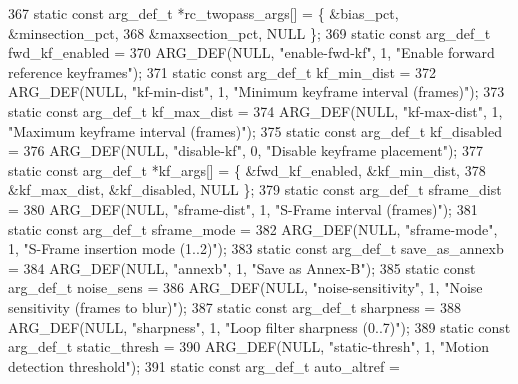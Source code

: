 \begin{DoxyCodeInclude}
{{{{{{{367 \textcolor{keyword}{static} \textcolor{keyword}{const} arg\_def\_t *rc\_twopass\_args[] = \{ &bias\_pct, &minsection\_pct,
368                                               &maxsection\_pct, NULL \};
369 \textcolor{keyword}{static} \textcolor{keyword}{const} arg\_def\_t fwd\_kf\_enabled =
370     ARG\_DEF(NULL, \textcolor{stringliteral}{"enable-fwd-kf"}, 1, \textcolor{stringliteral}{"Enable forward reference keyframes"});
371 \textcolor{keyword}{static} \textcolor{keyword}{const} arg\_def\_t kf\_min\_dist =
372     ARG\_DEF(NULL, \textcolor{stringliteral}{"kf-min-dist"}, 1, \textcolor{stringliteral}{"Minimum keyframe interval (frames)"});
373 \textcolor{keyword}{static} \textcolor{keyword}{const} arg\_def\_t kf\_max\_dist =
374     ARG\_DEF(NULL, \textcolor{stringliteral}{"kf-max-dist"}, 1, \textcolor{stringliteral}{"Maximum keyframe interval (frames)"});
375 \textcolor{keyword}{static} \textcolor{keyword}{const} arg\_def\_t kf\_disabled =
376     ARG\_DEF(NULL, \textcolor{stringliteral}{"disable-kf"}, 0, \textcolor{stringliteral}{"Disable keyframe placement"});
377 \textcolor{keyword}{static} \textcolor{keyword}{const} arg\_def\_t *kf\_args[] = \{ &fwd\_kf\_enabled, &kf\_min\_dist,
378                                       &kf\_max\_dist, &kf\_disabled, NULL \};
379 \textcolor{keyword}{static} \textcolor{keyword}{const} arg\_def\_t sframe\_dist =
380     ARG\_DEF(NULL, \textcolor{stringliteral}{"sframe-dist"}, 1, \textcolor{stringliteral}{"S-Frame interval (frames)"});
381 \textcolor{keyword}{static} \textcolor{keyword}{const} arg\_def\_t sframe\_mode =
382     ARG\_DEF(NULL, \textcolor{stringliteral}{"sframe-mode"}, 1, \textcolor{stringliteral}{"S-Frame insertion mode (1..2)"});
383 \textcolor{keyword}{static} \textcolor{keyword}{const} arg\_def\_t save\_as\_annexb =
384     ARG\_DEF(NULL, \textcolor{stringliteral}{"annexb"}, 1, \textcolor{stringliteral}{"Save as Annex-B"});
385 \textcolor{keyword}{static} \textcolor{keyword}{const} arg\_def\_t noise\_sens =
386     ARG\_DEF(NULL, \textcolor{stringliteral}{"noise-sensitivity"}, 1, \textcolor{stringliteral}{"Noise sensitivity (frames to blur)"});
387 \textcolor{keyword}{static} \textcolor{keyword}{const} arg\_def\_t sharpness =
388     ARG\_DEF(NULL, \textcolor{stringliteral}{"sharpness"}, 1, \textcolor{stringliteral}{"Loop filter sharpness (0..7)"});
389 \textcolor{keyword}{static} \textcolor{keyword}{const} arg\_def\_t static\_thresh =
390     ARG\_DEF(NULL, \textcolor{stringliteral}{"static-thresh"}, 1, \textcolor{stringliteral}{"Motion detection threshold"});
391 \textcolor{keyword}{static} \textcolor{keyword}{const} arg\_def\_t auto\_altref =
}}}}}}}
\end{DoxyCodeInclude}
